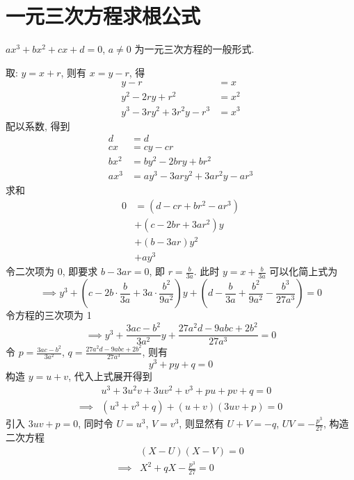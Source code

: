 \section{一元三次方程求根公式}

\begin{defination}
$ax^3 + bx^2 + cx + d = 0$, $a \ne 0$ 为一元三次方程的一般形式.
\end{defination}

\begin{solution}
取: $y = x + r$, 则有 $x = y - r$, 得
\[ \begin{aligned}
    y - r &= x \\
    y^2 - 2ry + r^2 &= x^2 \\
    y^3 - 3ry^2 + 3r^2y - r^3 &= x^3
\end{aligned} \]
配以系数, 得到
\[ \begin{aligned}
    d &= d \\
    cx &= cy - cr \\
    bx^2 &= by^2 - 2bry + br^2 \\
    ax^3 &= ay^3 - 3ary^2 + 3ar^2y - ar^3
\end{aligned} \]
求和
\[ \begin{aligned}
    0 &= (d - cr + br^2 - ar^3) \\
    &+ (c - 2br + 3ar^2) y \\
    &+ (b - 3ar) y^2 \\
    &+ ay^3
\end{aligned} \]
令二次项为 0, 即要求 $b - 3ar = 0$, 即 $r = \frac{b}{3a}$. 此时 $y = x + \frac{b}{3a}$ 可以化简上式为
\[
    \implies y^3 + (c - 2b \cdot \frac{b}{3a} + 3a \cdot \frac{b^2}{9a^2}) y
    + (d - \frac{b}{3a} + \frac{b^2}{9a^2} - \frac{b^3}{27a^3}) = 0
\]
令方程的三次项为 1
\[
    \implies y^3 + \frac{3ac-b^2}{3a^2} y + \frac{27a^2d - 9abc + 2b^2}{27a^3} = 0
\]
令 $p = \frac{3ac-b^2}{3a^2}$, $q = \frac{27a^2d - 9abc + 2b^2}{27a^3}$, 则有
\[
    y^3 + p y + q = 0
\]
构造 $y = u + v$, 代入上式展开得到
\[ \begin{aligned}
    & u^3 + 3u^2v + 3uv^2 + v^3 + pu + pv + q = 0 \\
    \implies & (u^3 + v^3 + q) + (u + v)(3uv + p) = 0
\end{aligned} \]
引入 $3uv + p = 0$, 同时令 $U = u^3$, $V = v^3$, 则显然有 $U + V = -q$, $UV = -\frac{p^3}{27}$, 构造二次方程
\[ \begin{aligned}
    & (X - U)(X - V) = 0 \\
    \implies & X^2 + qX - \frac{p^3}{27} = 0
\end{aligned} \]

\end{solution}
